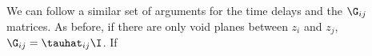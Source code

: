 We can follow a similar set of arguments for the time delays and the $\G_{i j}$ matrices. As before, if there are only void planes between $z_i$ and $z_j$, $\G_{i j} = \tauhat_{i j} \I$. If 
  